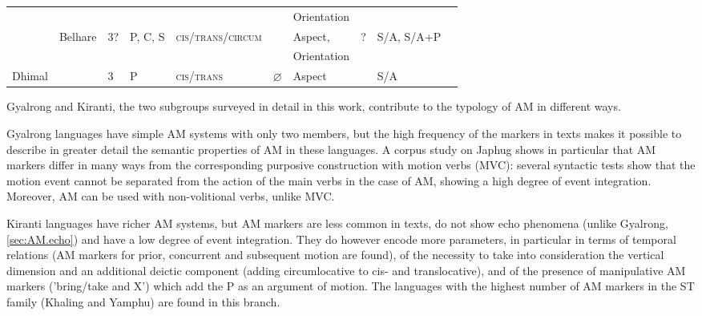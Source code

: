 \documentclass[oneside,a4paper,11pt]{article}
\newcommand{\Y}{\Checkmark}
\newcommand{\N}{\XSolidBrush}
\begin{document}
\begin{table}[H]
{\begin{tabular}{llllllllll}
        &&&&&&Orientation&&\\
&Belhare & 3? & P, C, S  & \textsc{cis}/\textsc{trans}/\textsc{circum}  &  \Y & Aspect,  &?  &S/A, S/A+P \\
        &&&&&&Orientation&&\\
\midrule
Dhimal &&3 &P &\textsc{cis}/\textsc{trans}  &  $\varnothing$ & Aspect  &  \Y &S/A \\
\bottomrule
 \end{tabular}}
\end{table}

Gyalrong and Kiranti, the two subgroups surveyed in detail in this work, contribute to the typology of AM in different ways.

Gyalrong languages have simple AM systems with only two members, but the high frequency of the markers in texts makes it possible to describe in greater detail the semantic properties of AM in these languages. A corpus study on Japhug shows in particular that AM markers differ in many ways from the corresponding purposive construction with motion verbs (MVC): several syntactic tests show that the motion event cannot be separated from the action of the main verbs in the case of AM, showing a high degree of event integration. Moreover, AM can be used with non-volitional verbs, unlike MVC.

Kiranti languages have richer AM systems, but AM markers are less common in texts, do not show echo phenomena (unlike Gyalrong, \ref{sec:AM.echo}) and have a low degree of event integration. They do however encode more parameters, in particular in terms of temporal relations (AM markers for prior, concurrent and subsequent motion are found), of the necessity to take into consideration the vertical dimension and an additional deictic component (adding circumlocative to cis- and translocative), and of the presence of manipulative AM markers ('bring/take and X') which add the P as an argument of motion. The languages with the highest number of AM markers in the ST family (Khaling and Yamphu) are found in this branch.
\end{document}

